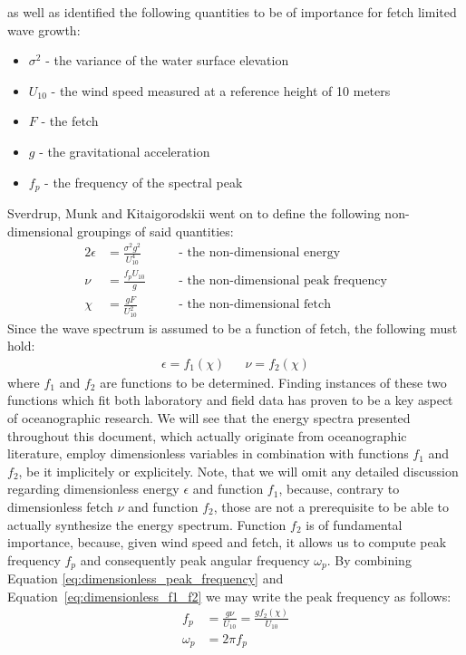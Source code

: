 \cite{report:SverdrupMunk1947} as well as \cite{article:Kitaigorodskii1962,book:Kitaigorodskii1970} 
identified the following quantities to be of importance for fetch limited wave
growth:
\begin{itemize}
 \item $\sigma^2$ - the variance of the water surface elevation
 \item $U_{10}$ - the wind speed measured at a reference height of 10 meters
 \item $F$ - the fetch
 \item $g$ - the gravitational acceleration
 \item $f_p$ - the frequency of the spectral peak
\end{itemize}
Sverdrup, Munk and Kitaigorodskii went on to define the following
non-dimensional groupings of said quantities:
\begin{alignat}{2}
 \epsilon &= \frac{\sigma^2 g^2}{U_{10}^{4}} \quad && \text{- the 
non-dimensional energy}\\
 \nu &= \frac{f_p U_{10}}{g} \quad && \text{- the non-dimensional peak 
frequency} \label{eq:dimensionless_peak_frequency} \\
 \chi &= \frac{gF}{U_{10}^{2}} \quad && \text{- the non-dimensional fetch} 
\label{eq:dimensionless_fetch}
\end{alignat}
Since the wave spectrum is assumed to be a function of fetch, the following 
must hold: 
\begin{align}
\label{eq:dimensionless_f1_f2}
 \epsilon = f_1(\chi) && \nu = f_2(\chi)
\end{align}
where $f_1$ and $f_2$ are functions to be determined. Finding instances of 
these two functions which fit both laboratory and field data has proven to be a 
key aspect of oceanographic research. We will see that the energy spectra
presented throughout this document, which actually originate from oceanographic
literature, employ dimensionless variables in combination with functions $f_1$
and $f_2$, be it implicitely or explicitely. Note, that we will omit any
detailed discussion regarding dimensionless energy $\epsilon$ and function
$f_1$, because, contrary to dimensionless fetch $\nu$ and function $f_2$, those
are not a prerequisite to be able to actually synthesize the energy spectrum.
Function $f_2$ is of fundamental importance, because, given wind speed and 
fetch, it allows us to compute peak frequency $f_p$ and consequently peak 
angular frequency $\omega_p$. By combining Equation 
\ref{eq:dimensionless_peak_frequency} and Equation~\ref{eq:dimensionless_f1_f2}
we may write the peak frequency as follows:
\begin{align}
 f_p &= \frac{g\nu}{U_{10}} = \frac{gf_2(\chi)}{U_{10}} 
\label{eq:f_p_from_dimensionless}\\
 \omega_p &= 2\pi f_p \label{eq:omega_p_from_dimensionless}
\end{align}
%
